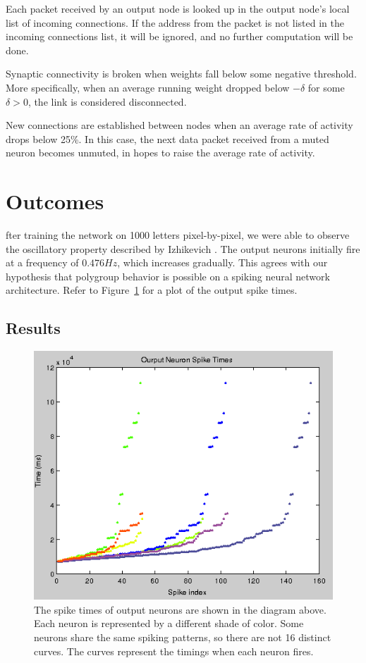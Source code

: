 \documentclass[journal]{./sty/IEEEtran}
\begin{document}
Each packet received by an output node is looked up in the output node's local list of incoming connections. If the address from the packet is not listed in the incoming connections list, it will be ignored, and no further computation will be done.

Synaptic connectivity is broken when weights fall below some negative threshold. More specifically, when an average running weight dropped below \(-\delta\) for some \(\delta > 0\), the link is considered disconnected.

New connections are established between nodes when an average rate of activity drops below 25\%. In this case, the next data packet received from a muted neuron becomes unmuted, in hopes to raise the average rate of activity.

\section{Outcomes}
fter training the network on 1000 letters pixel-by-pixel, we were able to
observe the oscillatory property described by Izhikevich \cite{Polychron:Izhi}.
The output neurons initially fire at a frequency of $0.476 Hz$, which increases gradually.
This agrees with our hypothesis that polygroup behavior is possible on a spiking neural network architecture.
Refer to Figure~\ref{fig:spikes} for a plot of the output spike times.

\subsection{Results}

\begin{figure}
\centering
\includegraphics[scale=0.4]{imgs/spikes}
\caption{The spike times of output neurons are shown in the diagram above. 
Each neuron is represented by a different shade of color.
Some neurons share the same spiking patterns, so there are not 16 distinct curves.
The curves represent the timings when each neuron fires.\label{fig:spikes}}
\end{figure}
\end{document}
